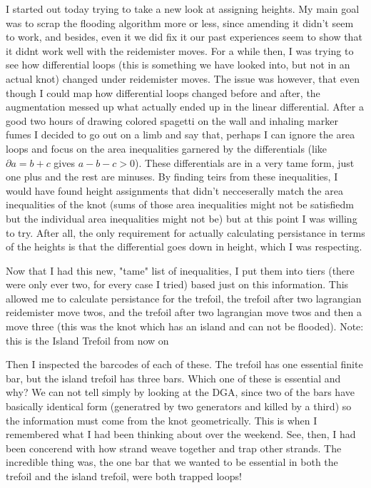\documentclass[11pt,oneside]{amsart}
\begin{document}
I started out today trying to take a new look at assigning heights. My main goal was to scrap the flooding algorithm more or less, since amending it didn't seem to work, and besides, even it we did fix it our past experiences seem to show that it didnt work well with the reidemister moves. For a while then, I was trying to see how differential loops (this is something we have looked into, but not in an actual knot) changed under reidemister moves. The issue was however, that even though I could map how differential loops changed before and after, the augmentation messed up what actually ended up in the linear differential. After a good two hours of drawing colored spagetti on the wall and inhaling marker fumes I decided to go out on a limb and say that, perhaps I can ignore the area loops and focus on the area inequalities garnered by the differentials (like $\partial a = b + c$ gives $a - b - c >0$). These differentials are in a very tame form, just one plus and the rest are minuses.  By finding teirs from these inequalities, I would have found height assignments that didn't necceserally match the area inequalities of the knot (sums of those area inequalities might not be satisfiedm but the individual area inequalities might not be) but at this point I was willing to try. After all, the only requirement for actually calculating persistance in terms of the heights is that the differential goes down in height, which I was respecting. 

Now that I had this new, "tame" list of inequalities, I put them into tiers (there were only ever two, for every case I tried) based just on this information. This allowed me to calculate persistance for the trefoil, the trefoil after two lagrangian reidemister move twos, and the trefoil after two lagrangian move twos and then a move three (this was the knot which has an island and can not be flooded). Note: this is the Island Trefoil from now on

Then I inspected the barcodes of each of these. The trefoil has one essential finite bar, but the island trefoil has three bars. Which one of these is essential and why? We can not tell simply by looking at the DGA, since two of the bars have basically identical form (generatred by two generators and killed by a third) so the information must come from the knot geometrically. This is when I remembered what I had been thinking about over the weekend. See, then, I had been concerend with how strand weave together and trap other strands. The incredible thing was, the one bar that we wanted to be essential in both the trefoil and the island trefoil, were both trapped loops!
\end{document}
